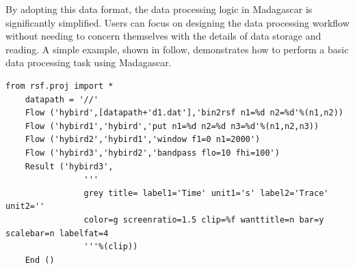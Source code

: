 By adopting this data format, the data processing logic in Madagascar is significantly simplified. Users can focus on designing the data processing workflow without needing to concern themselves with the details of data storage and reading. A simple example, shown in follow, demonstrates how to perform a basic data processing task using Madagascar.


\begin{lstlisting}[frame=single, breaklines=true, basicstyle=\ttfamily\small]
    from rsf.proj import *
    datapath = '//'
    Flow ('hybird',[datapath+'d1.dat'],'bin2rsf n1=%d n2=%d'%(n1,n2))
    Flow ('hybird1','hybird','put n1=%d n2=%d n3=%d'%(n1,n2,n3))
    Flow ('hybird2','hybird1','window f1=0 n1=2000')
    Flow ('hybird3','hybird2','bandpass flo=10 fhi=100')
    Result ('hybird3',
                '''
                grey title= label1='Time' unit1='s' label2='Trace' unit2=''
                color=g screenratio=1.5 clip=%f wanttitle=n bar=y scalebar=n labelfat=4
                '''%(clip))
    End ()
\end{lstlisting}

